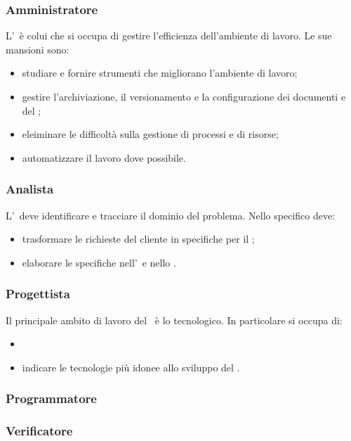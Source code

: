 \documentclass[../NormeDiProgetto.tex]{subfiles}
\begin{document}
			\subsubsection{Amministratore}
				L'\amministratore\ è colui che si occupa di gestire l'efficienza dell'ambiente di lavoro. 
				Le sue mansioni sono:
				\begin{itemize}
					\item studiare e fornire strumenti che migliorano l'ambiente di lavoro;
					\item gestire l'archiviazione, il versionamento e la configurazione dei documenti e del ;
					\item eleiminare le difficoltà sulla gestione di processi e di risorse;
					\item automatizzare il lavoro dove possibile.
				\end{itemize}
			\subsubsection{Analista}
				L'\analista\ deve identificare e tracciare il dominio del problema. 
				Nello specifico deve:
				\begin{itemize}
					\item trasformare le richieste del cliente in specifiche per il ;
					\item elaborare le specifiche nell'\analisideirequisiti\ e nello \studiodifattibilita.
				\end{itemize} 
			\subsubsection{Progettista}
				Il principale ambito di lavoro del \progettista\ è lo  tecnologico.
				In particolare si occupa di:
				\begin{itemize}
					\item 
					\item indicare le tecnologie più idonee allo sviluppo del .
				\end{itemize}	
			\subsubsection{Programmatore}
				
			\subsubsection{Verificatore}
				
\end{document}
